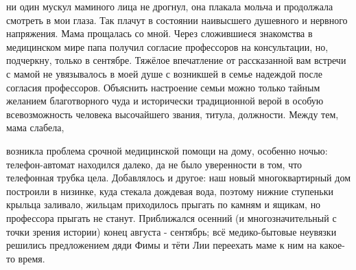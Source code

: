 \label{185-1}
ни один мускул маминого лица не дрогнул, она плакала мольча и продолжала смотреть в мои глаза. Так плачут в состоянии наивысшего душевного и нервного напряжения. Мама прощалась со мной.
Через сложившиеся знакомства в медицинском мире папа получил согласие профессоров на консультации, но, подчеркну, только в сентябре. Тяжёлое впечатление от рассказанной вам встречи с мамой не увязывалось в моей душе с возникшей в семье надеждой после согласия профессоров. Объяснить настроение семьи можно только тайным желанием благотворного чуда и исторически традиционной верой в особую всевозможность человека высочайшего звания, титула, должности. Между тем, мама слабела,

\label{186-1}
 возникла проблема срочной медицинской помощи на дому, особенно ночью: телефон-автомат находился далеко, да не было уверенности в том, что телефонная трубка цела. Добавлялось и другое: наш новый многоквартирный дом построили в низинке, куда стекала дождевая вода, поэтому нижние ступеньки крыльца заливало, жильцам приходилось прыгать по камням и ящикам, но профессора прыгать не станут. Приближался осенний (и многозначительный с точки зрения истории) конец августа - сентябрь; всё медико-бытовые неувязки решились предложением дяди Фимы и тёти Лии переехать маме к ним на какое-то время.
